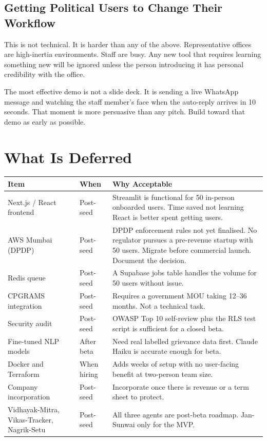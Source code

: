 \documentclass[12pt, a4paper]{article}
\begin{document}
\subsection{Getting Political Users to Change Their Workflow}

This is not technical. It is harder than any of the above.
Representative offices are high-inertia environments. Staff are busy.
Any new tool that requires learning something new will be ignored
unless the person introducing it has personal credibility with the office.

The most effective demo is not a slide deck. It is sending a live
WhatsApp message and watching the staff member's face when the
auto-reply arrives in 10 seconds. That moment is more persuasive
than any pitch. Build toward that demo as early as possible.

\newpage

\section{What Is Deferred}

\renewcommand{\arraystretch}{1.4}
\begin{tabularx}{\textwidth}{X p{2.5cm} X}
\toprule
\rowcolor{pollitylightblue}
\textbf{Item} & \textbf{When} & \textbf{Why Acceptable} \\
\midrule
Next.js / React frontend        & Post-seed   & Streamlit is functional for 50 in-person onboarded users. Time saved not learning React is better spent getting users. \\
AWS Mumbai (DPDP)               & Post-seed   & DPDP enforcement rules not yet finalised. No regulator pursues a pre-revenue startup with 50 users. Migrate before commercial launch. Document the decision. \\
Redis queue                     & Post-seed   & A Supabase jobs table handles the volume for 50 users without issue. \\
CPGRAMS integration             & Post-seed   & Requires a government MOU taking 12--36 months. Not a technical task. \\
Security audit                  & Post-seed   & OWASP Top 10 self-review plus the RLS test script is sufficient for a closed beta. \\
Fine-tuned NLP models           & After beta  & Need real labelled grievance data first. Claude Haiku is accurate enough for beta. \\
Docker and Terraform            & When hiring & Adds weeks of setup with no user-facing benefit at two-person team size. \\
Company incorporation           & Post-seed   & Incorporate once there is revenue or a term sheet to protect. \\
Vidhayak-Mitra, Vikas-Tracker, Nagrik-Setu & Post-seed & All three agents are post-beta roadmap. Jan-Sunwai only for the MVP. \\
\bottomrule
\end{tabularx}
\end{document}
